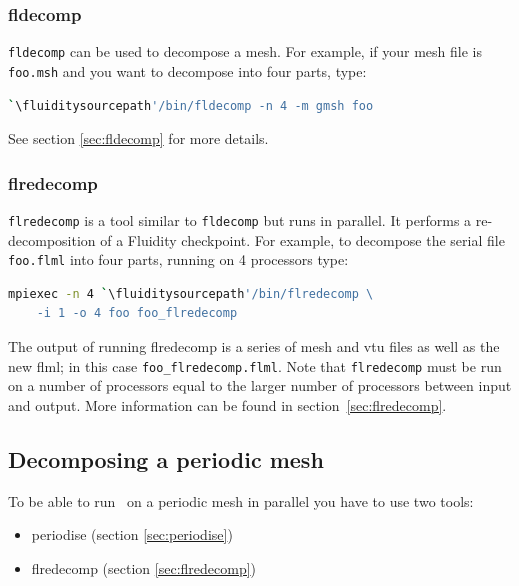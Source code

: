 \subsubsection{fldecomp}
\label{mesh!meshing tools!fldecomp}

\lstinline[language=bash]+fldecomp+ can be used to decompose a mesh. For example, if your mesh
file is \lstinline[language=bash]+foo.msh+ and you want to decompose into four parts, type:
\begin{lstlisting}[language = Bash]
`\fluiditysourcepath'/bin/fldecomp -n 4 -m gmsh foo
\end{lstlisting}
See section \ref{sec:fldecomp} for more details.

\subsubsection{flredecomp}
\label{mesh!meshing tools!flredecomp}
\lstinline[language=bash]+flredecomp+ is a tool similar to \lstinline[language=bash]+fldecomp+ but runs in parallel. 
It performs a re-decomposition of a Fluidity checkpoint.
For example, to decompose the serial file \lstinline+foo.flml+
into four parts, running on 4 processors type:

\begin{lstlisting}[language=bash]
mpiexec -n 4 `\fluiditysourcepath'/bin/flredecomp \
    -i 1 -o 4 foo foo_flredecomp
\end{lstlisting}

The output of running flredecomp is a series of mesh and vtu files as well
as the new flml; in this case \lstinline+foo_flredecomp.flml+. 
Note that \lstinline[language=bash]+flredecomp+ must be run on a number of processors equal to the larger number of processors between input and output.
More information can be found in section~\ref{sec:flredecomp}.

\subsection{Decomposing a periodic mesh}
\label{sec:decomposing_meshes_periodise}

To be able to run \fluidity\ on a periodic mesh in parallel you have to use
two tools:

\begin{itemize}
\item periodise (section \ref{sec:periodise})
\item flredecomp (section \ref{sec:flredecomp})
\end{itemize}

